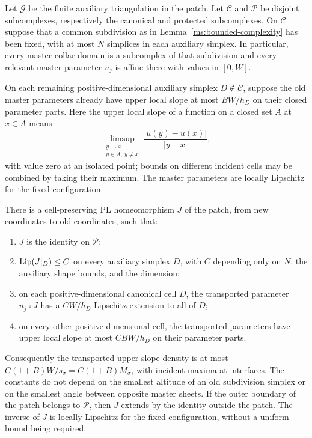 \begin{lemma}
\label{ms:snapping}
Let $\mathcal G$ be the finite auxiliary triangulation in the patch.
Let $\mathcal C$ and $\mathcal P$ be disjoint subcomplexes, respectively
the canonical and protected subcomplexes.  On $\mathcal C$ suppose
that a common subdivision as in
Lemma~\ref{ms:bounded-complexity} has been fixed, with at most $N$
simplices in each auxiliary simplex.  In particular, every master
collar domain is a subcomplex of that subdivision and every relevant
master parameter $u_j$ is affine there with values in $[0,W]$.

On each remaining positive-dimensional auxiliary simplex
$D\notin\mathcal C$, suppose the old master parameters already have
upper local slope at most $B W/h_D$ on their closed parameter parts.
Here the upper local slope of a function on a closed set $A$ at
$x\in A$ means
\[
 \limsup_{\substack{y\to x\\y\in A,\ y\ne x}}
 \frac{|u(y)-u(x)|}{|y-x|},
\]
with value zero at an isolated point; bounds on different incident
cells may be combined by taking their maximum.  The master
parameters are locally Lipschitz for the fixed configuration.

There is a cell-preserving PL homeomorphism $J$ of the patch, from
new coordinates to old coordinates, such that:
\begin{enumerate}
\item $J$ is the identity on $\mathcal P$;
\item $\operatorname{Lip}(J|_D)\leq C$ on every auxiliary simplex $D$, with $C$
depending only on $N$, the auxiliary shape bounds, and the dimension;
\item on each positive-dimensional canonical cell $D$, the transported parameter
$u_j\circ J$ has a $C W/h_D$-Lipschitz extension to all of $D$;
\item on every other positive-dimensional cell, the transported parameters have upper
local slope at most $C B W/h_D$ on their parameter parts.
\end{enumerate}
Consequently the transported upper slope density is at most
$C(1+B)W/s_\sigma=C(1+B)M_\sigma$, with incident maxima at
interfaces.  The constants do not depend on the smallest altitude
of an old subdivision simplex or on the smallest angle between
opposite master sheets.
If the outer boundary of the patch belongs to $\mathcal P$, then
$J$ extends by the identity outside the patch.  The inverse of $J$
is locally Lipschitz for the fixed configuration, without a uniform
bound being required.
\end{lemma}

